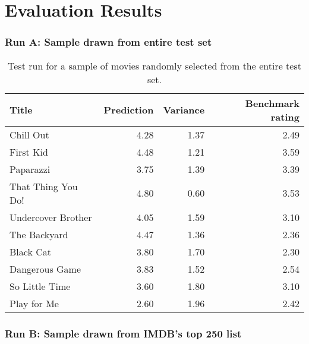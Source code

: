 
\chapter{Evaluation Results} %

\label{AppendixA} %



\subsection{Run A: Sample drawn from entire test set}

\begin{table}[h]
  \begin{center}
    \begin{tabular}{|l|rr|r|}
      \hline
      \textbf{Title} & \textbf{Prediction} & \textbf{Variance} & \textbf{Benchmark rating} \\
      \hline
      Chill Out          & 4.28 & 1.37 & 2.49 \\
      First Kid          & 4.48 & 1.21 & 3.59 \\
      Paparazzi          & 3.75 & 1.39 & 3.39 \\
      That Thing You Do! & 4.80 & 0.60 & 3.53 \\
      Undercover Brother & 4.05 & 1.59 & 3.10 \\
      The Backyard       & 4.47 & 1.36 & 2.36 \\
      Black Cat          & 3.80 & 1.70 & 2.30 \\
      Dangerous Game     & 3.83 & 1.52 & 2.54 \\
      So Little Time     & 3.60 & 1.80 & 3.10 \\
      Play for Me        & 2.60 & 1.96 & 2.42 \\
      \hline
    \end{tabular}
  \end{center}
  \caption{Test run for a sample of movies randomly selected from the entire test set.}
  \label{tab:test_run_all}
\end{table}


\subsection{Run B: Sample drawn from IMDB's top 250 list}

